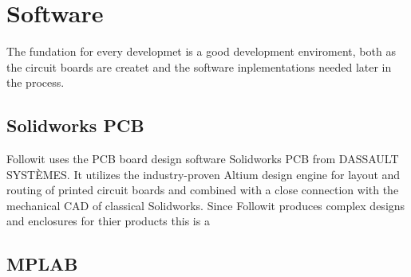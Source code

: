 \section{Software}
The fundation for every developmet is a good development enviroment, both as the circuit boards are createt and the software inplementations needed later in the process. 

\subsection{Solidworks PCB}
Followit uses the PCB board design software Solidworks PCB from DASSAULT SYSTÈMES. It utilizes the industry-proven Altium design engine for layout and routing of printed circuit boards and combined with a close connection with the mechanical CAD of classical Solidworks. Since Followit produces complex designs and enclosures for thier products this is a 

\subsection{MPLAB}